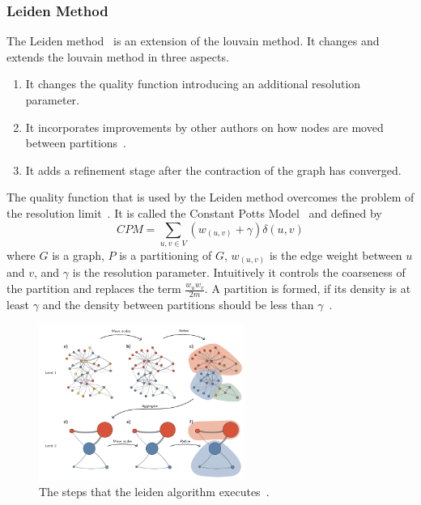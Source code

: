         \subsubsection*{Leiden Method}
            The Leiden method~\autocite{traag2019louvain} is an extension of the louvain method.
            It changes and extends the louvain method in three aspects.
            \begin{enumerate}
                \item It changes the quality function introducing an additional resolution parameter.
                \item It incorporates improvements by other authors on how nodes are moved between partitions~\autocite{movd,movc,movb,mova}.
                \item It adds a refinement stage after the contraction of the graph has converged.
            \end{enumerate}
            The quality function that is used by the Leiden method overcomes the problem of the resolution limit~\autocite{traag2011narrow, fortunato2007resolution}.
            It is called the Constant Potts Model~\autocite{potts1952some, traag2011narrow} and defined by 
            \[ CPM = \sum_{u,v \in V}(w_{(u,v)} + \gamma) \delta(u, v) \]
            where $G$ is a graph, $P$ is a partitioning of $G$, $w_{(u,v)}$ is the edge weight between $u$ and $v$, and $\gamma$ is the resolution parameter. 
            Intuitively it controls the coarseness of the partition and replaces the term $\frac{w_u w_v}{2m}$.
            A partition is formed, if its density is at least $\gamma$ and the density between partitions should be less than $\gamma$~\autocite{traag2019louvain}.
            
            \begin{figure}[htp]
                \begin{center}
                    \includegraphics[keepaspectratio,width=0.6\textwidth]{img/03-graphs/leiden.png}
                \end{center}
                \caption{The steps that the leiden algorithm executes~\autocite{traag2019louvain}.} 
                \label{leiden-fig}
            \end{figure}
            

